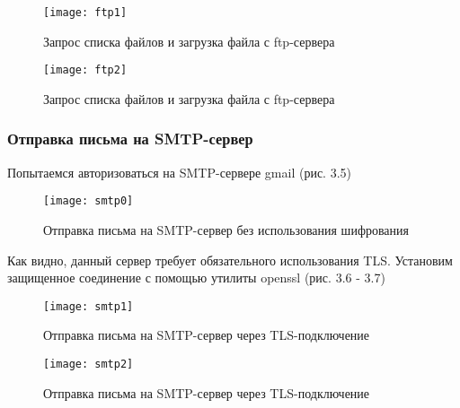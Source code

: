\begin{figure}[H]
	\begin{center}
		\texttt{[image: ftp1]}
		\caption{Запрос списка файлов и загрузка файла с ftp-сервера} 
		\label{pic:pic_name} %
	\end{center}
\end{figure}

\begin{figure}[H]
	\begin{center}
		\texttt{[image: ftp2]}
		\caption{Запрос списка файлов и загрузка файла с ftp-сервера} 
		\label{pic:pic_name} %
	\end{center}
\end{figure}

\subsubsection{Отправка письма на SMTP-сервер}

Попытаемся авторизоваться на SMTP-сервере gmail  (рис. 3.5)

\begin{figure}[H]
	\begin{center}
		\texttt{[image: smtp0]}
		\caption{Отправка письма на SMTP-сервер без использования шифрования} 
		\label{pic:pic_name} %
	\end{center}
\end{figure}

Как видно, данный сервер требует обязательного использования TLS. Установим защищенное соединение с помощью утилиты openssl (рис. 3.6 - 3.7)

\begin{figure}[H]
	\begin{center}
		\texttt{[image: smtp1]}
		\caption{Отправка письма на SMTP-сервер через TLS-подключение}
		\label{pic:pic_name} %
	\end{center}
\end{figure}

\begin{figure}[H]
	\begin{center}
		\texttt{[image: smtp2]}
		\caption{Отправка письма на SMTP-сервер через TLS-подключение} 
		\label{pic:pic_name} %
	\end{center}
\end{figure}


